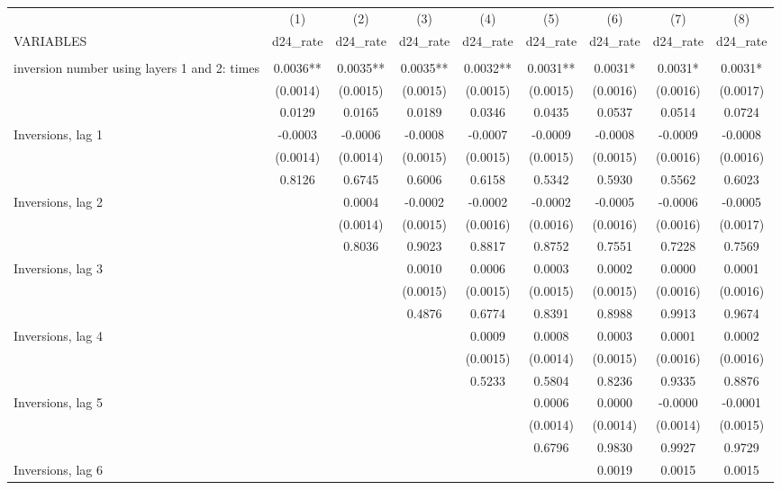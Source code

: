 \begin{tabular}{lcccccccc} \hline
 & (1) & (2) & (3) & (4) & (5) & (6) & (7) & (8) \\
VARIABLES & d24\_rate & d24\_rate & d24\_rate & d24\_rate & d24\_rate & d24\_rate & d24\_rate & d24\_rate \\ \hline
 &  &  &  &  &  &  &  &  \\
inversion number using layers 1 and 2: times & 0.0036** & 0.0035** & 0.0035** & 0.0032** & 0.0031** & 0.0031* & 0.0031* & 0.0031* \\
 & (0.0014) & (0.0015) & (0.0015) & (0.0015) & (0.0015) & (0.0016) & (0.0016) & (0.0017) \\
 & 0.0129 & 0.0165 & 0.0189 & 0.0346 & 0.0435 & 0.0537 & 0.0514 & 0.0724 \\
Inversions, lag 1 & -0.0003 & -0.0006 & -0.0008 & -0.0007 & -0.0009 & -0.0008 & -0.0009 & -0.0008 \\
 & (0.0014) & (0.0014) & (0.0015) & (0.0015) & (0.0015) & (0.0015) & (0.0016) & (0.0016) \\
 & 0.8126 & 0.6745 & 0.6006 & 0.6158 & 0.5342 & 0.5930 & 0.5562 & 0.6023 \\
Inversions, lag 2 &  & 0.0004 & -0.0002 & -0.0002 & -0.0002 & -0.0005 & -0.0006 & -0.0005 \\
 &  & (0.0014) & (0.0015) & (0.0016) & (0.0016) & (0.0016) & (0.0016) & (0.0017) \\
 &  & 0.8036 & 0.9023 & 0.8817 & 0.8752 & 0.7551 & 0.7228 & 0.7569 \\
Inversions, lag 3 &  &  & 0.0010 & 0.0006 & 0.0003 & 0.0002 & 0.0000 & 0.0001 \\
 &  &  & (0.0015) & (0.0015) & (0.0015) & (0.0015) & (0.0016) & (0.0016) \\
 &  &  & 0.4876 & 0.6774 & 0.8391 & 0.8988 & 0.9913 & 0.9674 \\
Inversions, lag 4 &  &  &  & 0.0009 & 0.0008 & 0.0003 & 0.0001 & 0.0002 \\
 &  &  &  & (0.0015) & (0.0014) & (0.0015) & (0.0016) & (0.0016) \\
 &  &  &  & 0.5233 & 0.5804 & 0.8236 & 0.9335 & 0.8876 \\
Inversions, lag 5 &  &  &  &  & 0.0006 & 0.0000 & -0.0000 & -0.0001 \\
 &  &  &  &  & (0.0014) & (0.0014) & (0.0014) & (0.0015) \\
 &  &  &  &  & 0.6796 & 0.9830 & 0.9927 & 0.9729 \\
Inversions, lag 6 &  &  &  &  &  & 0.0019 & 0.0015 & 0.0015 \\

\end{tabular}
